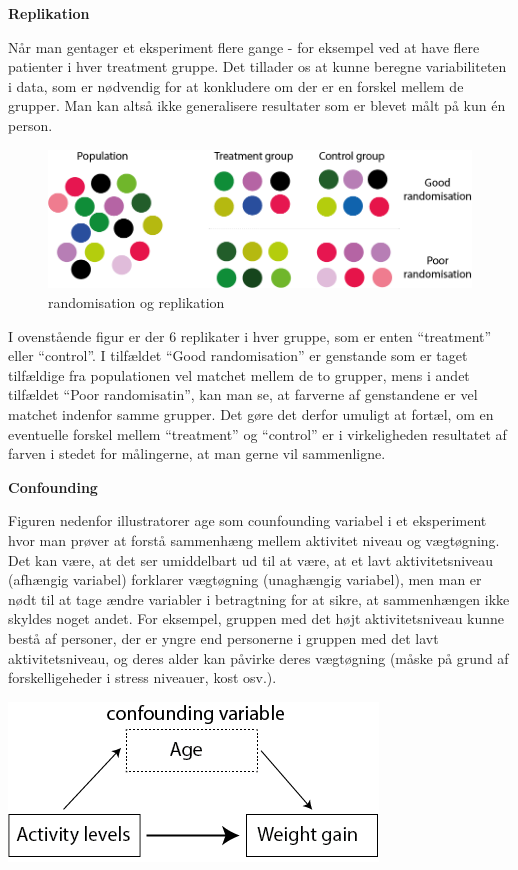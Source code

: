 \documentclass[
]{book}
\begin{document}
\textbf{Replikation}

Når man gentager et eksperiment flere gange - for eksempel ved at have flere patienter i hver treatment gruppe. Det tillader os at kunne beregne variabiliteten i data, som er nødvendig for at konkludere om der er en forskel mellem de grupper. Man kan altså ikke generalisere resultater som er blevet målt på kun én person.

\begin{figure}
\includegraphics[width=1\linewidth]{plots/randomisation} \caption{randomisation og replikation}\label{fig:unnamed-chunk-582}
\end{figure}

I ovenstående figur er der 6 replikater i hver gruppe, som er enten ``treatment'' eller ``control''. I tilfældet ``Good randomisation'' er genstande som er taget tilfældige fra populationen vel matchet mellem de to grupper, mens i andet tilfældet ``Poor randomisatin'', kan man se, at farverne af genstandene er vel matchet indenfor samme grupper. Det gøre det derfor umuligt at fortæl, om en eventuelle forskel mellem ``treatment'' og ``control'' er i virkeligheden resultatet af farven i stedet for målingerne, at man gerne vil sammenligne.

\textbf{Confounding}

Figuren nedenfor illustratorer age som counfounding variabel i et eksperiment hvor man prøver at forstå sammenhæng mellem aktivitet niveau og vægtøgning. Det kan være, at det ser umiddelbart ud til at være, at et lavt aktivitetsniveau (afhængig variabel) forklarer vægtøgning (unaghængig variabel), men man er nødt til at tage ændre variabler i betragtning for at sikre, at sammenhængen ikke skyldes noget andet. For eksempel, gruppen med det højt aktivitetsniveau kunne bestå af personer, der er yngre end personerne i gruppen med det lavt aktivitetsniveau, og deres alder kan påvirke deres vægtøgning (måske på grund af forskelligeheder i stress niveauer, kost osv.).

\includegraphics[width=0.6\linewidth]{plots/confounding_illus}
\end{document}
